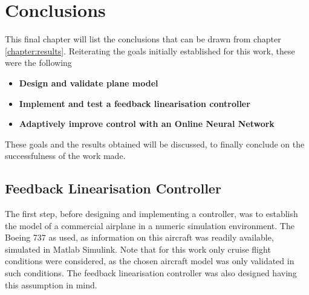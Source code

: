 
\chapter{Conclusions}
\label{chapter:conclusions}

This final chapter will list the conclusions that can be drawn from chapter \ref{chapter:results}. Reiterating the goals initially established for this work, these were the following

\begin{itemize}
\item \textbf{Design and validate plane model}
\item \textbf{Implement and test a feedback linearisation controller}
\item \textbf{Adaptively improve control with an Online Neural Network}
\end{itemize}

These goals and the results obtained will be discussed, to finally conclude on the successfulness of the work made. 

\section{Feedback Linearisation Controller}
\label{section:conclusions/fbl_controller}

The first step, before designing and implementing a controller, was to establish the model of a commercial airplane in a numeric simulation environment. The Boeing 737 as used, as information on this aircraft was readily available, simulated in Matlab Simulink. Note that for this work only cruise flight conditions were considered, as the chosen aircraft model was only validated in such conditions. The feedback linearisation controller was also designed having this assumption in mind. 


